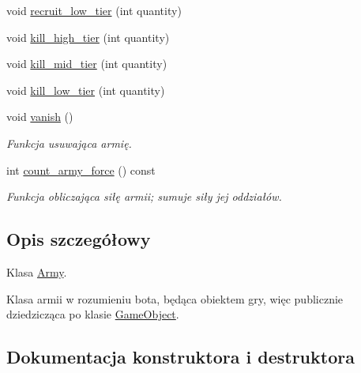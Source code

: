 \begin{DoxyCompactItemize}
\item 
void \hyperlink{classmodel_1_1Army_a64148705305e62116c2f8feb170a917d}{recruit\+\_\+low\+\_\+tier} (int quantity)
\item 
void \hyperlink{classmodel_1_1Army_a4821e64f682c7b07e4e0909b58980509}{kill\+\_\+high\+\_\+tier} (int quantity)
\item 
void \hyperlink{classmodel_1_1Army_a25e008794fb0295355658734000f9924}{kill\+\_\+mid\+\_\+tier} (int quantity)
\item 
void \hyperlink{classmodel_1_1Army_ae9f218c741bba69fab5ba304a037411b}{kill\+\_\+low\+\_\+tier} (int quantity)
\item 
\mbox{\label{classmodel_1_1Army_a1cc5910e80ec81d3030895e9315407d1}} 
void \hyperlink{classmodel_1_1Army_a1cc5910e80ec81d3030895e9315407d1}{vanish} ()
\begin{DoxyCompactList}\small\item\em Funkcja usuwająca armię. \end{DoxyCompactList}\item 
\mbox{\label{classmodel_1_1Army_acf38d070e85d7d407dc098eab5400f75}} 
int \hyperlink{classmodel_1_1Army_acf38d070e85d7d407dc098eab5400f75}{count\+\_\+army\+\_\+force} () const
\begin{DoxyCompactList}\small\item\em Funkcja obliczająca siłę armii; sumuje siły jej oddziałów. \end{DoxyCompactList}\end{DoxyCompactItemize}


\subsection{Opis szczegółowy}
Klasa \hyperlink{classmodel_1_1Army}{Army}. 

Klasa armii w rozumieniu bota, będąca obiektem gry, więc publicznie dziedzicząca po klasie \hyperlink{classmodel_1_1GameObject}{Game\+Object}. 

\subsection{Dokumentacja konstruktora i destruktora}
\mbox{\label{classmodel_1_1Army_a09146560c4983f1d478cd490cc266333}} 
